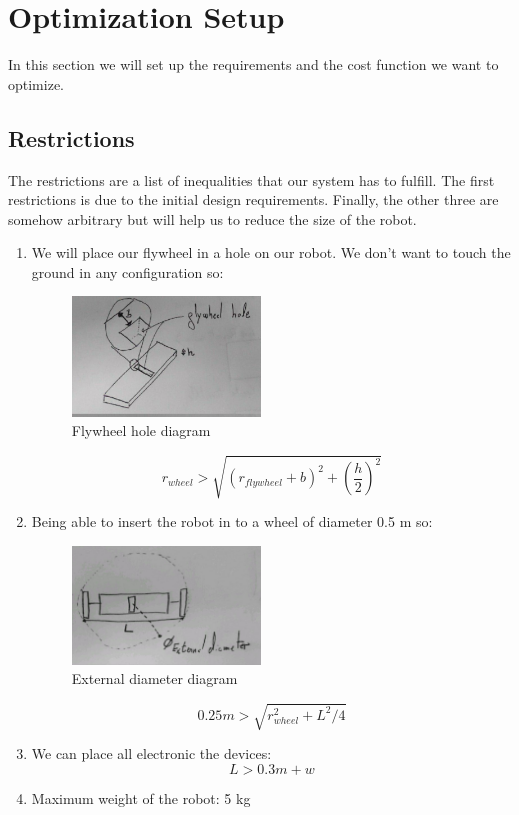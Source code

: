 \section{Optimization Setup}
In this section we will set up the requirements and the cost function we want to optimize.

\subsection{Restrictions}
The restrictions are a list of inequalities that our system has to fulfill.
The first restrictions is due to the initial design requirements. Finally, the other three are 
somehow arbitrary but will help us to reduce the size of the robot.
\begin{enumerate}
\item We will place our flywheel in a hole on our robot. We don't want to touch the ground
in any configuration so:
\begin{figure}[ht]
	\centering
	\includegraphics[width=5cm]{img/flywheel_hole.jpg}
	\caption{Flywheel hole diagram}
	\label{fig:Flywheel hole diagram}
\end{figure}
\[r_{wheel}> \sqrt{(r_{flywheel} + b)^2+(\frac{h}{2})^2}\]
\item Being able  to insert the robot in to a wheel of diameter 0.5 m so:
\begin{figure}[ht]
	\centering
	\includegraphics[width=5cm]{img/external_diameter.jpg}
	\caption{External diameter diagram}
	\label{fig:External diameter diagram}
\end{figure}
\[0.25 m > \sqrt{r_{wheel}^2 + L^2/4}\]
\item We can place all electronic the devices:
\[L > 0.3m + w \]
\item Maximum weight of the robot: 5 kg
\end{enumerate}

